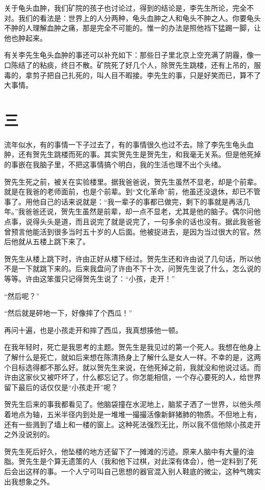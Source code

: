 关于龟头血肿，我们矿院的孩子也讨论过，得到的结论是，李先生所论，完全不对。我们的看法是：世界上的人分两种，龟头血肿之人和龟头不肿之人。你要龟头不肿的人理解血肿之痛，那是完全不可能的。惟一的办法是照他裆下猛踢一脚，让他也肿起来。 

有关李先生龟头血肿的事还可以补充如下：那些日子里北京上空充满了阴霾，像一口陈结了的粘痰，终日不散。矿院死了好几个人，除贺先生跳楼，还有上吊的，服毒的，拿剪子把自己扎死的，叫人目不暇接。李先生的事，只是好笑而已，算不了大事情。

\section{三}

流年似水，有的事情一下子过去了，有的事情很久也过不去。除了李先生龟头血肿，还有贺先生跳楼而死的事。其实贺先生是贺先生，和我毫无关系。但是他死掉的事嵌在我脑子里，不把这事情搞个明白，我的生活也理不出个头绪。 

贺先生死之前，被关在实验楼里。据我爸爸说，贺先生虽然不显老，却是个前辈。就是在我爸的老师面前，也是个前辈。到“文化革命”前，他虽还没退休，却已不管事了。用他自己的话来说就是：“我一辈子的事都已做完，剩下的事就是再活几年。”我爸爸还说，贺先生虽然是前辈，却一点不显老，尤其是他的脑子。偶尔问他点事，说得头头是道，而且说完了就是说完了，一句多余的话也没有。据此我爸爸曾预言他能活到很多当时五十岁的人后面。他被捉进去，是因为当过很大的官。然后他就从五楼上跳下来了。 

贺先生从楼上跳下时，许由正好从楼下经过。贺先生还和许由说了几句话，所以他不是一下就跳下来的。后来我盘问了许由不下十次，问贺先生说了什么，怎么说的等等。许由这笨蛋只记得贺先生说了：“小孩，走开！” 


“然后呢？” 

“然后就是砰地一下，好像摔了个西瓜！” 

再问十遍，也是小孩走开和摔了西瓜，我真想揍他一顿。 

在我年轻时，死亡是我思考的主题。贺先生是我见过的第一个死人。我想在他身上了解什么是死亡，就如后来想在陈清扬身上了解什么是女人一样。不幸的是，这两个目标选得都不那么好。就以贺先生来说，在他死掉之前，我就没和他说过话。而许由这家伙又被吓坏了，什么都忘记了。你怎能相信，一个存心要死的人，给世界留下最后的话仅仅是“小孩走开”呢？ 

贺先生后来的事我都看见了。他脑袋撞在水泥地上，脑浆子洒了一世界，以他头颅着地点为轴，五米半径内到处是一堆堆一撮撮活像新鲜猪肺的物质。不但地上有，还有一些溅到了墙上和一楼的窗上。这种死法强烈无比，所以我不信他除小孩走开之外没说别的。 

贺先生死后好久，他坠楼的地方还留下了一摊滩的污迹。原来人脑中有大量的油脂。贺先生是个算无遗策的人（我和他下过棋，对此深有体会），他一定料到了死后会出这样的事。一个人宁可叫自己思想的器官混入别人鞋底的微尘，这种气魄实出我想象之外。 


